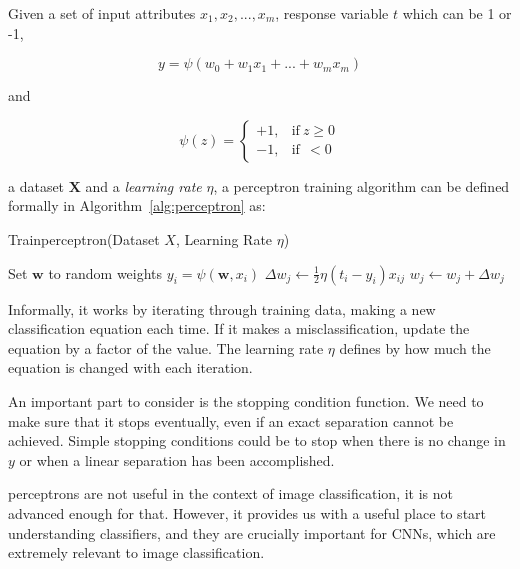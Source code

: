 \documentclass{article}
\begin{document}
\begin{multicols}{2}
Given a set of input attributes $x_1, x_2, ..., x_m$, response variable $t$ which can be 1 or -1, 

\begin{equation}
	y = \psi(w_0 + w_1 x_1 + ... + w_m x_m)
\end{equation}

and

\begin{equation}
	\psi(z) = 
	\begin{cases}
		+1, & \text{if}\ z \ge 0 \\
		-1, & \text{if}\ \ < 0
	\end{cases}
\end{equation}

a dataset $\textbf{X}$ and a \textit{learning rate} $\eta$, a perceptron training algorithm can be defined formally in Algorithm~\ref{alg:perceptron} as:

\begin{algorithm}[H]
	\caption{Trainperceptron(Dataset $X$, Learning Rate $\eta$)}
	\begin{algorithmic}
		\State Set $\textbf{w}$ to random weights
				\State $y_i = \psi(\textbf{w}, x_i) $
					\State $\Delta w_{j} \leftarrow \frac{1}{2} \eta (t_{i} - y_{i})x_{ij}$
					\State $w_{j} \leftarrow w_{j} + \Delta w_{j}$
				\EndFor
			\EndFor
		\EndWhile 
	\end{algorithmic}
	\label{alg:perceptron}
\end{algorithm}

Informally, it works by iterating through training data, making a new classification equation each time. If it makes a misclassification, update the equation by a factor of the value. The learning rate $\eta$ defines by how much the equation is changed with each iteration. 

An important part to consider is the stopping condition function. We need to make sure that it stops eventually, even if an exact separation cannot be achieved. Simple stopping conditions could be to stop when there is no change in $y$ or when a linear separation has been accomplished. 

perceptrons are not useful in the context of image classification, it is not advanced enough for that. However, it provides us with a useful place to start understanding classifiers, and they are crucially important for CNNs, which are extremely relevant to image classification. 


\end{multicols}
\end{document}
